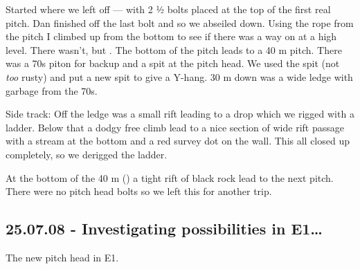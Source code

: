 Started where we left off --- with 2 ½ bolts placed at
the top of the first real pitch. Dan finished off the last bolt and so
we abseiled down. Using the rope from the pitch I climbed up from the
bottom to see if there was a way on at a high level. There wasn't, but
.
The bottom of the pitch leads to a 40 m pitch. There was a 70s piton for
backup and a spit at the pitch head. We used the spit (not \textit{too}
rusty) and put a new spit to give a Y-hang. 30 m down was a wide ledge
with garbage from the 70s.

Side track: Off the ledge was a small rift leading to a drop which
we rigged with a ladder. Below that a dodgy free climb lead to a nice
section of wide rift passage with a stream at the bottom and a red
survey dot on the wall. This all closed up completely, so we derigged
the ladder.

At the bottom of the 40 m () a tight rift of black
rock lead to the next pitch. There were no pitch head bolts so we left
this for another trip. 


\subsection{25.07.08 - Investigating possibilities in E1\ldots{}}


\begin{marginfigure}
\checkoddpage \ifoddpage \forcerectofloat \else \forceversofloat \fi
\centering
 \caption{The new pitch head in E1. }
 \label{pitch head e1}
\end{marginfigure}

